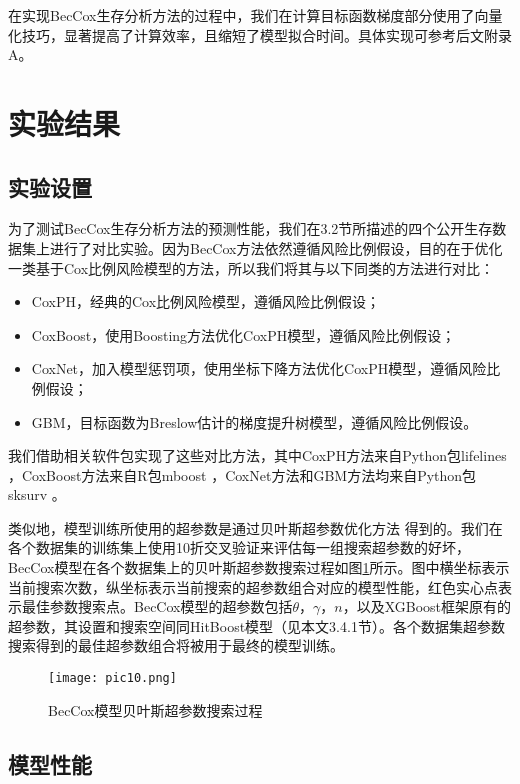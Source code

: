 在实现BecCox生存分析方法的过程中，我们在计算目标函数梯度部分使用了向量化技巧，显著提高了计算效率，且缩短了模型拟合时间。具体实现可参考后文附录A。

\section{实验结果}

\subsection{实验设置}

为了测试BecCox生存分析方法的预测性能，我们在3.2节所描述的四个公开生存数据集上进行了对比实验。因为BecCox方法依然遵循风险比例假设，目的在于优化一类基于Cox比例风险模型的方法，所以我们将其与以下同类的方法进行对比：
\begin{itemize}
  \item CoxPH，经典的Cox比例风险模型，遵循风险比例假设；
  \item CoxBoost，使用Boosting方法优化CoxPH模型，遵循风险比例假设；
  \item CoxNet，加入模型惩罚项，使用坐标下降方法优化CoxPH模型，遵循风险比例假设；
  \item GBM，目标函数为Breslow估计的梯度提升树模型，遵循风险比例假设。
\end{itemize}
我们借助相关软件包实现了这些对比方法，其中CoxPH方法来自Python包lifelines ，CoxBoost方法来自R包mboost ，CoxNet方法和GBM方法均来自Python包sksurv 。

类似地，模型训练所使用的超参数是通过贝叶斯超参数优化方法 得到的。我们在各个数据集的训练集上使用10折交叉验证来评估每一组搜索超参数的好坏，BecCox模型在各个数据集上的贝叶斯超参数搜索过程如图\ref{pic10}所示。图中横坐标表示当前搜索次数，纵坐标表示当前搜索的超参数组合对应的模型性能，红色实心点表示最佳参数搜索点。BecCox模型的超参数包括$\theta$，$\gamma$，$n$，以及XGBoost框架原有的超参数，其设置和搜索空间同HitBoost模型（见本文3.4.1节）。各个数据集超参数搜索得到的最佳超参数组合将被用于最终的模型训练。

\begin{figure}[H]
\texttt{[image: pic10.png]}
\caption{BecCox模型贝叶斯超参数搜索过程}
\label{pic10}
\end{figure}

\subsection{模型性能}

